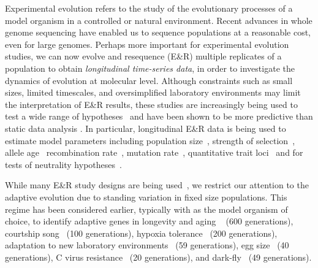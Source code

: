 \documentclass[9pt,twocolumn,twoside]{gsajnl}
\begin{document}
Experimental evolution refers to the study of the evolutionary
processes of a model organism in a controlled
\cite{hegreness2006equivalence,lang2013pervasive,orozco2012adaptation,
	lang2011genetic,barrick2009genome,bollback2007clonal,oz2014strength}
or natural
\cite{maldarelli2013hiv,reid2011new,denef2012situ,winters2012development,
	daniels2013genetic,barrett2008natural,bergland2014genomic}
environment. Recent advances in whole genome sequencing have enabled
us to sequence populations at a reasonable cost, even for large
genomes. Perhaps more important for experimental evolution studies, we
can now evolve and resequence (E\&R) multiple replicates of a population to
obtain \emph{longitudinal time-series data}, in order to investigate
the dynamics of evolution at molecular level.  Although constraints
such as small sizes, limited timescales, and oversimplified
laboratory environments may limit the interpretation of E\&R results,
these studies are increasingly being used to test a wide range of
hypotheses~\cite{kawecki2012experimental} and have been shown to be
more predictive than static data analysis
\cite{boyko2008assessing,desai2008polymorphism,sawyer1992population}.
In particular, longitudinal E\&R data is being used to estimate model
parameters including population
size~\cite{williamson1999using,wang2001pseudo,pollak1983new,waples1989generalized,
	Terhorst2015Multi, jonas2016estimating}, strength of
selection~\cite{mathieson2013estimating,illingworth2011distinguishing,Terhorst2015Multi,
	bollback2008estimation,illingworth2012quantifying,malaspinas2012estimating,
	steinrucken2014novel}, allele age~\cite{malaspinas2012estimating}
recombination rate~\cite{Terhorst2015Multi}, mutation
rate~\cite{Barrick2013Genome, Terhorst2015Multi}, quantitative trait
loci~\cite{baldwin2014power} and for tests of neutrality
hypotheses~\cite{feder2014Identifying,Terhorst2015Multi,burke2010genome,bergland2014genomic}.


While many E\&R study designs are being
used~\cite{Barrick2013Genome,schlotterer2015combining}, we restrict
our attention to the adaptive evolution due to standing variation in fixed size 
populations. This regime has been considered earlier, typically with
\dmel as the model organism of choice, to identify adaptive genes in
longevity and aging ~\cite{burke2010genome,remolina2012genomic} (600
generations), courtship song~\cite{turner2011population} (100
generations), hypoxia tolerance~\cite{zhou2011experimental} (200
generations), adaptation to new laboratory
environments~\cite{orozco2012adaptation,franssen2015patterns} (59
generations), egg size~\cite{jha2015whole} (40 generations), C virus
resistance~\cite{martins2014host} (20 generations), and
dark-fly~\cite{izutsu2015dynamics} (49 generations).
\end{document}
